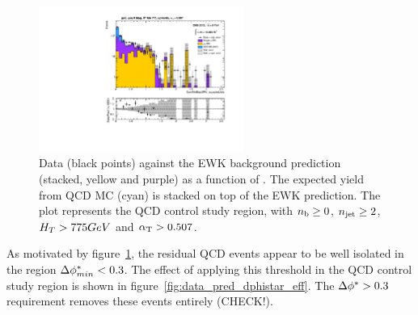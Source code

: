 \begin{figure}
  \centering
  \includegraphics[width=0.6\textwidth]
  {Figs/datapred/qcd_study_region/ge2j_ge0b_775_upwards/Prediction_ComMinBiasDPhi_acceptedJets_all_775_upwards_QCD}
  \caption{Data (black points) against the EWK background prediction 
  (stacked, yellow and purple) as a function of \mindphistar. The expected yield
  from QCD MC (cyan) is stacked on top of the EWK prediction. The plot represents
  the QCD control study region, with $n_{\text{b}} \geq 0$, $n_{\text{jet}} \geq 2$, $H_T > 775
  GeV$ and $\alpha_{\text{T}} > 0.507$.}
  \label{fig:qcd_region_pred_dphistar_incl}
\end{figure}

As motivated by figure~\ref{fig:qcd_region_pred_dphistar_incl}, the residual QCD
events appear to be well isolated in the region $\Delta \phi^*_{min} < 0.3$. The effect
of applying this threshold in the QCD control study region is shown in
figure~\ref{fig:data_pred_dphistar_eff}. The $\Delta \phi^* > 0.3$ requirement
removes these events entirely (CHECK!).

